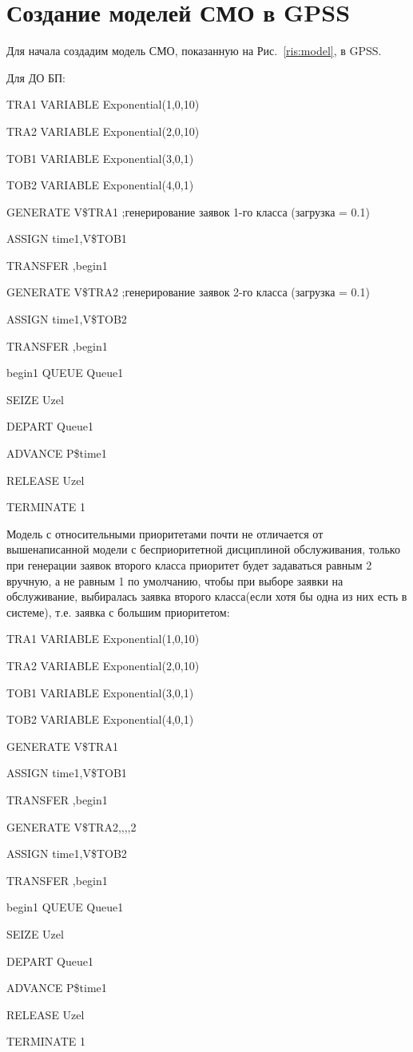 \documentclass[a4paper,14pt]{report} %
\begin{document}
\section{Создание моделей СМО в GPSS}
Для начала создадим модель СМО, показанную на Рис.~\ref{ris:model}, в GPSS.

Для ДО БП:\par\noindent
TRA1	VARIABLE	Exponential(1,0,10) \par\noindent
TRA2	VARIABLE	Exponential(2,0,10) \par\noindent
TOB1	VARIABLE	Exponential(3,0,1) \par\noindent
TOB2	VARIABLE	Exponential(4,0,1)  \par              
GENERATE	V\$TRA1 ;генерирование заявок 1-го класса (загрузка = 0.1)\par 
ASSIGN 	time1,V\$TOB1 \par
TRANSFER ,begin1 \par
GENERATE	V\$TRA2 ;генерирование заявок 2-го класса (загрузка = 0.1)\par 
ASSIGN 	time1,V\$TOB2 \par
TRANSFER ,begin1 \par\noindent
begin1	QUEUE	Queue1 \par
SEIZE 	Uzel \par
DEPART	Queue1 \par
ADVANCE 	P\$time1 \par
RELEASE 	Uzel \par
TERMINATE 1 \par
\vspace{0.5cm} 
Модель с относительными приоритетами почти не отличается от вышенаписанной модели с бесприоритетной дисциплиной обслуживания, только при генерации заявок второго класса приоритет будет задаваться равным 2 вручную, а не равным 1 по умолчанию, чтобы при выборе заявки на обслуживание, выбиралась заявка второго класса(если хотя бы одна из них есть в системе), т.е. заявка с большим приоритетом:\par\noindent
TRA1	VARIABLE	Exponential(1,0,10) \par\noindent
TRA2	VARIABLE	Exponential(2,0,10) \par\noindent
TOB1	VARIABLE	Exponential(3,0,1) \par\noindent
TOB2	VARIABLE	Exponential(4,0,1)  \par              
GENERATE	V\$TRA1 \par 
ASSIGN 	time1,V\$TOB1 \par
TRANSFER ,begin1 \par
GENERATE	V\$TRA2,,,,2 \par 
ASSIGN 	time1,V\$TOB2 \par
TRANSFER ,begin1 \par\noindent
begin1	QUEUE	Queue1 \par
SEIZE 	Uzel \par
DEPART	Queue1 \par
ADVANCE 	P\$time1 \par
RELEASE 	Uzel \par
TERMINATE 1 \par
\end{document}
